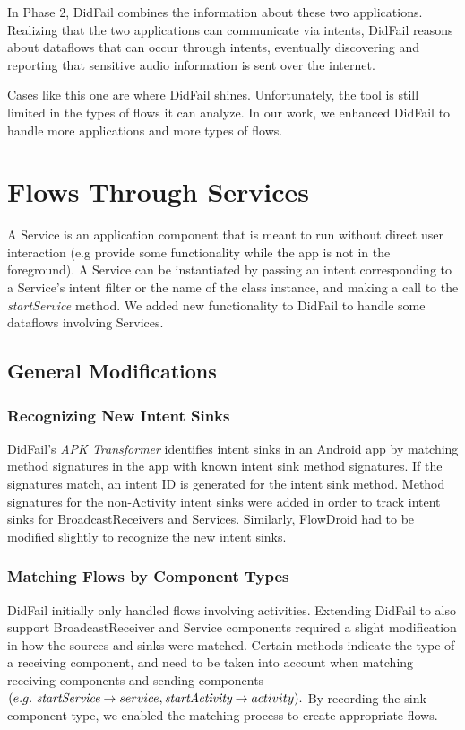 In Phase 2, DidFail combines the information about these two applications. Realizing that the two applications can communicate via intents, DidFail reasons about dataflows that can occur through intents, eventually discovering and reporting that sensitive audio information is sent over the internet. 

Cases like this one are where DidFail shines. 
Unfortunately, the tool is still limited in the types of flows it can analyze. In our work, we enhanced DidFail to handle more applications and more types of flows.


\section{Flows Through Services}
A Service is an application component that is meant to run without direct user interaction (e.g provide some functionality while the app is not in the foreground). A Service can be instantiated by passing an intent corresponding to a Service's intent filter or the name of the class instance, and making a call to the \emph{startService} method. We added new functionality to DidFail to handle some dataflows involving Services.  

\subsection{General Modifications}
\subsubsection{Recognizing New Intent Sinks}
DidFail's \emph{APK Transformer} identifies intent sinks in an Android app by matching method signatures in the app with known intent sink method signatures. If the signatures match, an intent ID is generated for the intent sink method. Method signatures for the non-Activity intent sinks were added in order to track intent sinks for BroadcastReceivers and Services. Similarly, FlowDroid had to be modified slightly to recognize the new intent sinks. 

\subsubsection{Matching Flows by Component Types}
DidFail initially only handled flows involving activities. Extending DidFail to also support BroadcastReceiver and Service components required a slight modification in how the sources and sinks were matched. Certain methods indicate the type of a receiving component, and need to be taken into account when matching receiving components and sending components $(e.g.\  \emph{startService} \rightarrow service, \emph{startActivity} \rightarrow activity).$ By recording the sink component type, we enabled the matching process to create appropriate flows.

